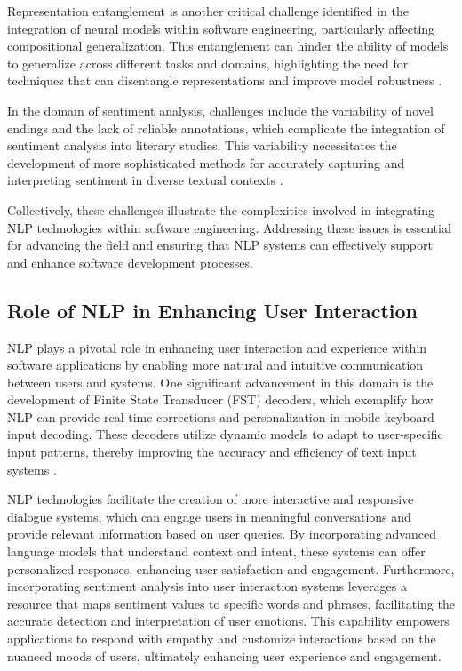 Representation entanglement is another critical challenge identified in the integration of neural models within software engineering, particularly affecting compositional generalization. This entanglement can hinder the ability of models to generalize across different tasks and domains, highlighting the need for techniques that can disentangle representations and improve model robustness \cite{zheng2023layerwiserepresentationfusioncompositional}.



In the domain of sentiment analysis, challenges include the variability of novel endings and the lack of reliable annotations, which complicate the integration of sentiment analysis into literary studies. This variability necessitates the development of more sophisticated methods for accurately capturing and interpreting sentiment in diverse textual contexts \cite{jannidis2016analyzingfeaturesdetectionhappy}.



Collectively, these challenges illustrate the complexities involved in integrating NLP technologies within software engineering. Addressing these issues is essential for advancing the field and ensuring that NLP systems can effectively support and enhance software development processes.



\subsection{Role of NLP in Enhancing User Interaction} \label{subsec:Role of NLP in Enhancing User Interaction}



NLP plays a pivotal role in enhancing user interaction and experience within software applications by enabling more natural and intuitive communication between users and systems. One significant advancement in this domain is the development of Finite State Transducer (FST) decoders, which exemplify how NLP can provide real-time corrections and personalization in mobile keyboard input decoding. These decoders utilize dynamic models to adapt to user-specific input patterns, thereby improving the accuracy and efficiency of text input systems \cite{ouyang2017mobilekeyboardinputdecoding}.



NLP technologies facilitate the creation of more interactive and responsive dialogue systems, which can engage users in meaningful conversations and provide relevant information based on user queries. By incorporating advanced language models that understand context and intent, these systems can offer personalized responses, enhancing user satisfaction and engagement. Furthermore, incorporating sentiment analysis into user interaction systems leverages a resource that maps sentiment values to specific words and phrases, facilitating the accurate detection and interpretation of user emotions. This capability empowers applications to respond with empathy and customize interactions based on the nuanced moods of users, ultimately enhancing user experience and engagement. \cite{jannidis2016analyzingfeaturesdetectionhappy}




